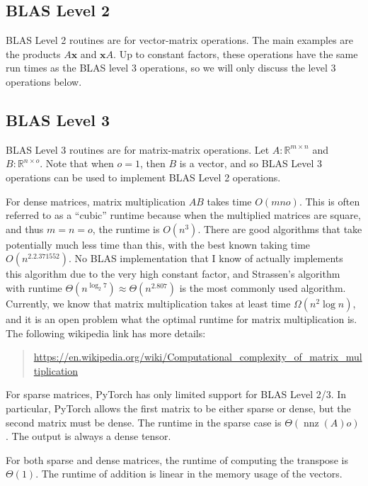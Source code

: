 \documentclass[10pt]{article}
\theoremstyle{definition}
\newcommand{\R}{\mathbb R}
\DeclareMathOperator{\nnz}{nnz}
\newcommand{\x}{\mathbf x}
\begin{document}
\newpage
\subsection{BLAS Level 2}

BLAS Level 2 routines are for vector-matrix operations.
The main examples are the products $A\x$ and $\x A$.
Up to constant factors, these operations have the same run times as the BLAS level 3 operations, so we will only discuss the level 3 operations below.

\subsection{BLAS Level 3}

BLAS Level 3 routines are for matrix-matrix operations.
Let $A : \R^{m\times n}$ and $B : \R^{n \times o}$.
Note that when $o=1$, then $B$ is a vector, and so BLAS Level 3 operations can be used to implement BLAS Level 2 operations.

For dense matrices, matrix multiplication $AB$ takes time $O(mno)$.
This is often referred to as a ``cubic'' runtime because when the multiplied matrices are square,
and thus $m=n=o$,
the runtime is $O(n^3)$.
There are good algorithms that take potentially much less time than this,
with the best known taking time $O(n^{2.2.371552})$.
No BLAS implementation that I know of actually implements this algorithm due to the very high constant factor,
and Strassen's algorithm with runtime $\Theta(n^{\log_2 7})\approx\Theta(n^{2.807})$ is the most commonly used algorithm.
Currently, we know that matrix multiplication takes at least time $\Omega(n^2\log n)$,
and it is an open problem what the optimal runtime for matrix multiplication is.
The following wikipedia link has more details:
\begin{quote}
    \url{https://en.wikipedia.org/wiki/Computational_complexity_of_matrix_multiplication}
\end{quote}

For sparse matrices, PyTorch has only limited support for BLAS Level 2/3.
In particular, PyTorch allows the first matrix to be either sparse or dense,
but the second matrix must be dense.
The runtime in the sparse case is $\Theta(\nnz(A)o)$.
The output is always a dense tensor.

For both sparse and dense matrices,
the runtime of computing the transpose is $\Theta(1)$.
The runtime of addition is linear in the memory usage of the vectors.
\end{document}
